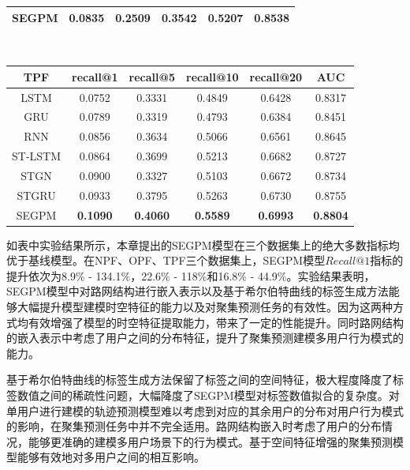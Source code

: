 \documentclass[master]{thesis-uestc}
\begin{document}
\begin{table}[!ht]
{\begin{tabular}{cccccc}
SEGPM&\textbf{0.0835}&\textbf{0.2509}&\textbf{0.3542}&\textbf{0.5207}&0.8538\\
\bottomrule[1.5pt] %
\end{tabular}
\\
\centering
\begin{tabular}{cccccc}%
\toprule[1.5pt]  %
\textbf{TPF}  & recall@1 & recall@5 & recall@10 & recall@20 & AUC\\
\midrule[0.75pt]
LSTM    & 0.0752 & 0.3331 & 0.4849 & 0.6428 & 0.8317 \\

GRU     & 0.0789 & 0.3319 & 0.4793 & 0.6384 & 0.8451 \\

RNN     & 0.0856 & 0.3634 & 0.5066 & 0.6561 & 0.8645 \\

ST-LSTM & 0.0864 & 0.3699 & 0.5213 & 0.6682 & 0.8727 \\

STGN    & 0.0900 & 0.3327 & 0.5103 & 0.6672 & 0.8734 \\

STGRU   & 0.0933 & 0.3795 & 0.5263 & 0.6730 & 0.8755 \\

SEGPM&\textbf{0.1090}&\textbf{0.4060}&\textbf{0.5589}&\textbf{0.6993}&\textbf{0.8804}\\
\bottomrule[1.5pt] %
\end{tabular}}
\end{table}

如表中实验结果所示，本章提出的SEGPM模型在三个数据集上的绝大多数指标均优于基线模型。在NPF、OPF、TPF三个数据集上，SEGPM模型$Recall@1$指标的提升依次为8.9$\%$ - 134.1$\%$，22.6$\%$ - 118$\%$和16.8$\%$ - 44.9$\%$。实验结果表明，SEGPM模型中对路网结构进行嵌入表示以及基于希尔伯特曲线的标签生成方法能够大幅提升模型建模时空特征的能力以及对聚集预测任务的有效性。因为这两种方式均有效增强了模型的时空特征提取能力，带来了一定的性能提升。同时路网结构的嵌入表示中考虑了用户之间的分布特征，提升了聚集预测建模多用户行为模式的能力。

基于希尔伯特曲线的标签生成方法保留了标签之间的空间特征，极大程度降度了标签数值之间的稀疏性问题，大幅降度了SEGPM模型对标签数值拟合的复杂度。对单用户进行建模的轨迹预测模型难以考虑到对应的其余用户的分布对用户行为模式的影响，在聚集预测任务中并不完全适用。路网结构嵌入时考虑了用户的分布情况，能够更准确的建模多用户场景下的行为模式。基于空间特征增强的聚集预测模型能够有效地对多用户之间的相互影响。
\end{document}
